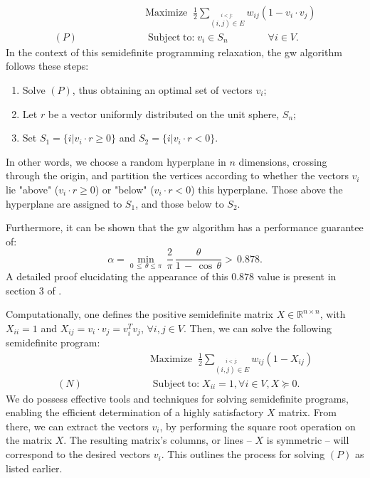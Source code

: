 \vspace{-5mm}
\begin{equation}
  \begin{split}
  &\mathrm{Maximize}\;\;\frac{1}{2}\sum_{\stackrel{i < j:}{(i,j)\in E}}w_{i j}(1-v_{i} \cdot v_{j}) \\
  (P)\qquad\qquad\qquad&\operatorname{Subject\;to:}v_{i}\in S_n \qquad\qquad\forall i\in V.
  \end{split}
\end{equation}
In the context of this semidefinite programming relaxation, the \acrshort{gw} algorithm follows these steps:
\begin{enumerate}
  \item Solve $(P)$, thus obtaining an optimal set of vectors $v_{i}$;
  \item Let $r$ be a vector uniformly distributed on the unit sphere, $S_n$;
  \item Set $S_1 = \{i|v_{i} \cdot r \geq 0\}$ and $S_2 = \{i|v_{i} \cdot r < 0\}$.
\end{enumerate}
In other words, we choose a random hyperplane in $n$ dimensions, crossing through the origin, and partition the vertices according to whether the vectors $v_{i}$ lie "above" ($v_{i} \cdot r \geq 0$) or "below" ($v_{i} \cdot r < 0$) this hyperplane. Those above the hyperplane are assigned to $S_1$, and those below to $S_2$.

Furthermore, it can be shown that the \acrshort{gw} algorithm has a performance guarantee of:
\begin{equation}
  \alpha=\operatorname*{min}_{0\,\leq\,\theta\leq\pi}\,\frac{2}{\pi}\,\frac{\theta}{1\,-\,\cos\,\theta} > \,0.878.
\end{equation}
A detailed proof elucidating the appearance of this $0.878$ value is present in section $3$ of \cite{GW-Algorithm}.

Computationally, one defines the positive semidefinite matrix $X \in \mathbb{R}^{n \times n}$, with $X_{ii} = 1$ and $X_{ij} = v_{i} \cdot v_{j} = v_{i}^{T} v_j$, $\forall i, j \in V$. Then, we can solve the following semidefinite program:
\begin{equation}
  \begin{split}
  &\mathrm{Maximize}\;\;\frac{1}{2}\sum_{\stackrel{i < j:}{(i,j)\in E}}w_{i j}(1-X_{ij}) \\
  (N)\qquad\qquad\qquad&\operatorname{Subject\;to:}X_{ii} = 1, \forall i\in V, X \succeq 0.
  \end{split}
\end{equation}
We do possess effective tools and techniques for solving semidefinite programs, enabling the efficient determination of a highly satisfactory $X$ matrix. From there, we can extract the vectors $v_{i}$, by performing the square root operation on the matrix $X$. The resulting matrix's columns, or lines – $X$ is symmetric – will correspond to the desired vectors $v_{i}$. This outlines the process for solving $(P)$ as listed earlier.

